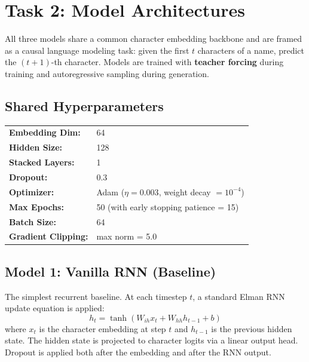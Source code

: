 \documentclass[11pt,a4paper]{article}
\begin{document}
\section{Task 2: Model Architectures}

All three models share a common character embedding backbone and are framed as a causal language modeling task: given the first $t$ characters of a name, predict the $(t{+}1)$-th character. Models are trained with \textbf{teacher forcing} during training and autoregressive sampling during generation.

\subsection{Shared Hyperparameters}

\begin{infoBox}
\begin{center}
\renewcommand{\arraystretch}{1.2}
\begin{tabular}{ll}
    \textbf{Embedding Dim:} & 64 \\
    \textbf{Hidden Size:}   & 128 \\
    \textbf{Stacked Layers:} & 1 \\
    \textbf{Dropout:}        & 0.3 \\
    \textbf{Optimizer:}      & Adam ($\eta = 0.003$, weight decay $= 10^{-4}$) \\
    \textbf{Max Epochs:}     & 50 (with early stopping patience = 15) \\
    \textbf{Batch Size:}     & 64 \\
    \textbf{Gradient Clipping:} & max norm = 5.0 \\
\end{tabular}
\end{center}
\end{infoBox}

\vspace{0.5em}

\subsection{Model 1: Vanilla RNN (Baseline)}
The simplest recurrent baseline. At each timestep $t$, a standard Elman RNN update equation is applied:
\[ h_t = \tanh(W_{ih} x_t + W_{hh} h_{t-1} + b) \]
where $x_t$ is the character embedding at step $t$ and $h_{t-1}$ is the previous hidden state. The hidden state is projected to character logits via a linear output head. Dropout is applied both after the embedding and after the RNN output.
\end{document}
